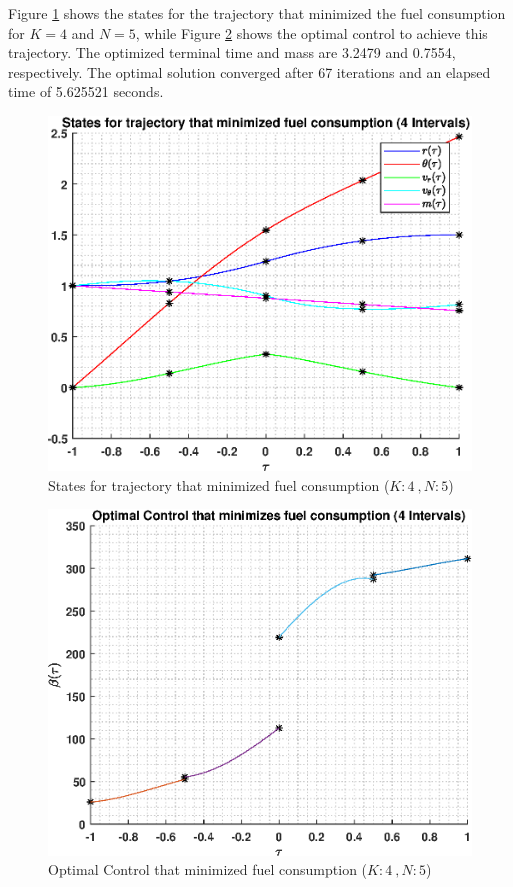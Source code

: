 \documentclass[]{article}
\begin{document}
\vspace{2mm}\newline 
Figure \ref{fig:directStatesK4Poly5} shows the states for the trajectory that minimized the fuel consumption for \(K = 4\) and  \(N = 5\), while Figure \ref{fig:directControlK4Poly5} shows the optimal control to achieve this trajectory. The optimized terminal time and mass are 3.2479 and 0.7554, respectively. The optimal solution converged after 67 iterations and an elapsed time of 5.625521 seconds.
\begin{figure}
	\centering
	\includegraphics[scale=0.75]{directStatesK4Poly5.eps}
	\caption{States for trajectory that minimized fuel consumption (\(K:4\ , N:5\))}
	\label{fig:directStatesK4Poly5}
\end{figure}
\begin{figure}
	\centering
	\includegraphics[scale=0.75]{directControlK4Poly5.eps}
	\caption{Optimal Control that minimized fuel consumption (\(K:4\ , N:5\))}
	\label{fig:directControlK4Poly5}
\end{figure}
\end{document}
